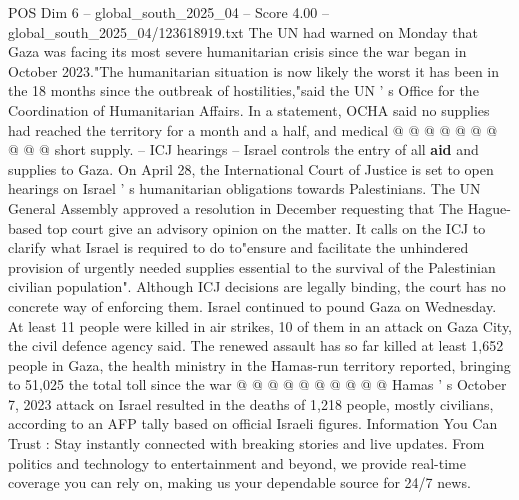 \begin{textsample}{POS Dim 6 – global\_south\_2025\_04 – Score 4.00 – global\_south\_2025\_04/123618919.txt}
The UN had warned on Monday that Gaza was facing its most severe humanitarian crisis since the war began in October 2023."The humanitarian situation is now likely the worst it has been in the 18 months since the outbreak of hostilities,"said the UN ' s Office for the Coordination of Humanitarian Affairs.
In a statement, OCHA said no supplies had reached the territory for a month and a half, and medical @ @ @ @ @ @ @ @ @ @ short supply. -- ICJ hearings -- Israel controls the entry of all \textbf{aid} and supplies to Gaza.
On April 28, the International Court of Justice is set to open hearings on Israel ' s humanitarian obligations towards Palestinians.
The UN General Assembly approved a resolution in December requesting that The Hague-based top court give an advisory opinion on the matter.
It calls on the ICJ to clarify what Israel is required to do to"ensure and facilitate the unhindered provision of urgently needed supplies essential to the survival of the Palestinian civilian population".
Although ICJ decisions are legally binding, the court has no concrete way of enforcing them.
Israel continued to pound Gaza on Wednesday.
At least 11 people were killed in air strikes, 10 of them in an attack on Gaza City, the civil defence agency said.
The renewed assault has so far killed at least 1,652 people in Gaza, the health ministry in the Hamas-run territory reported, bringing to 51,025 the total toll since the war @ @ @ @ @ @ @ @ @ @ Hamas ' s October 7, 2023 attack on Israel resulted in the deaths of 1,218 people, mostly civilians, according to an AFP tally based on official Israeli figures.
Information You Can Trust : Stay instantly connected with breaking stories and live updates.
From politics and technology to entertainment and beyond, we provide real-time coverage you can rely on, making us your dependable source for 24/7 news.

\end{textsample}
